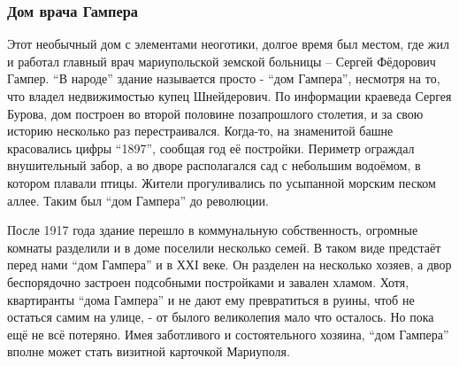  
 
 
 
 

\subsubsection{Дом врача Гампера}

Этот необычный дом с элементами неоготики, долгое время был местом, где жил и
работал главный врач мариупольской земской больницы – Сергей Фёдорович Гампер.
\enquote{В народе} здание называется просто - \enquote{дом Гампера}, несмотря
на то, что владел недвижимостью купец Шнейдерович. По информации краеведа
Сергея Бурова, дом построен во второй половине позапрошлого столетия, и за свою
историю несколько раз перестраивался. Когда-то, на знаменитой башне красовались
цифры \enquote{1897}, сообщая год её постройки. Периметр ограждал внушительный
забор, а во дворе располагался сад с небольшим водоёмом, в котором плавали
птицы. Жители прогуливались по усыпанной морским песком аллее. Таким был
\enquote{дом Гампера} до революции.


После 1917 года здание перешло в коммунальную собственность, огромные комнаты
разделили и в доме поселили несколько семей. В таком виде предстаёт перед нами
\enquote{дом Гампера} и в ХХІ веке. Он разделен на несколько хозяев, а двор
беспорядочно застроен подсобными постройками и завален хламом. Хотя,
квартиранты \enquote{дома Гампера} и не дают ему превратиться в руины, чтоб не
остаться самим на улице, - от былого великолепия мало что осталось. Но пока ещё
не всё потеряно. Имея заботливого и состоятельного хозяина, \enquote{дом
Гампера} вполне может стать визитной карточкой Мариуполя.

